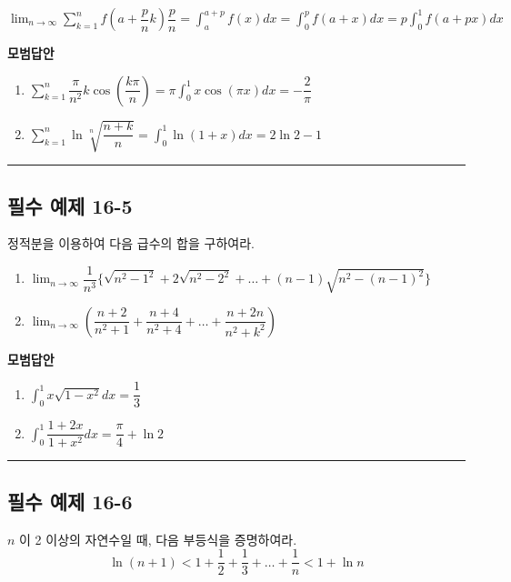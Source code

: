 \documentclass[a4paper,11pt]{article}
\begin{document}
\begin{studybox}
$\displaystyle \lim_{n \to \infty} \sum_{k=1}^{n} f\left(a + \dfrac{p}{n}k\right) \dfrac{p}{n}=\displaystyle \int_{a}^{a+p} f(x) dx=\displaystyle \int_{0}^{p} f(a+x) dx=\displaystyle p \int_{0}^{1} f(a+px) dx$
\end{studybox}

\textbf{모범답안} \\
\begin{enumerate}[label=(\arabic*)]
    \item $\displaystyle \sum_{k=1}^{n} \dfrac{\pi}{n^2} k \cos \left( \dfrac{k\pi}{n} \right) = \pi \int_0^1 x \cos(\pi x) dx = -\dfrac{2}{\pi}$
    \item $\displaystyle \sum_{k=1}^{n} \ln \sqrt[n]{\dfrac{n+k}{n}} = \int_0^1 \ln(1+x) dx = 2\ln 2 - 1$ 
\end{enumerate}

\vspace{0.5cm}
\hrule
\vspace{0.5cm}

\subsection*{필수 예제 16-5}
정적분을 이용하여 다음 급수의 합을 구하여라. 
\begin{enumerate}[label=(\arabic*)]
    \item $\displaystyle \lim_{n \to \infty} \dfrac{1}{n^3} \{ \sqrt{n^2-1^2} + 2\sqrt{n^2-2^2} + \dots + (n-1)\sqrt{n^2-(n-1)^2} \}$
    \item $\displaystyle \lim_{n \to \infty} ( \dfrac{n+2}{n^2+1} + \dfrac{n+4}{n^2+4} + \dots + \dfrac{n+2n}{n^2+k^2} )$
\end{enumerate}

\textbf{모범답안} \\
\begin{enumerate}[label=(\arabic*)]
    \item $\displaystyle \int_0^1 x \sqrt{1-x^2} dx = \dfrac{1}{3}$
    \item $\displaystyle \int_0^1 \dfrac{1+2x}{1+x^2} dx = \dfrac{\pi}{4} + \ln 2$
\end{enumerate}

\vspace{0.5cm}
\hrule
\vspace{0.5cm}

\subsection*{필수 예제 16-6}
$n$ 이 2 이상의 자연수일 때, 다음 부등식을 증명하여라. 
\[ \ln(n+1) < 1 + \dfrac{1}{2} + \dfrac{1}{3} + \dots + \dfrac{1}{n} < 1 + \ln n \]
\end{document}
